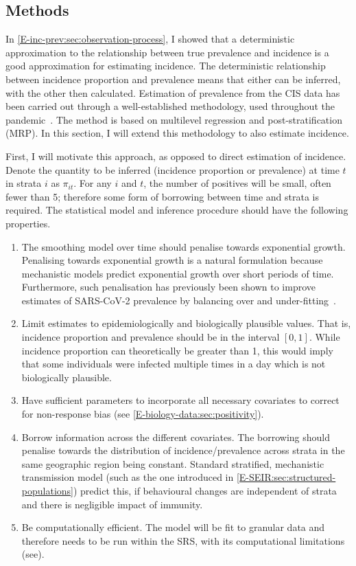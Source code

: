 \documentclass[thesis.tex]{subfiles}
\begin{document}
\subsection{Methods} \label{backcalc:sec:methods}

In \cref{E-inc-prev:sec:observation-process}, I showed that a deterministic approximation to the relationship between true prevalence and incidence is a good approximation for estimating incidence.
The deterministic relationship between incidence proportion and prevalence means that either can be inferred, with the other then calculated.
Estimation of prevalence from the CIS data has been carried out through a well-established methodology, used throughout the pandemic~\autocite{pouwelsCommunity,cisMethodsONS}.
The method is based on multilevel regression and post-stratification (MRP).
In this section, I will extend this methodology to also estimate incidence.

First, I will motivate this approach, as opposed to direct estimation of incidence.
Denote the quantity to be inferred (incidence proportion or prevalence) at time $t$ in strata $i$ as $\pi_{it}$.
For any $i$ and $t$, the number of positives will be small, often fewer than 5; therefore some form of borrowing between time and strata is required.
The statistical model and inference procedure should have the following properties.
\begin{enumerate}
    \item The smoothing model over time should penalise towards exponential growth. Penalising towards exponential growth is a natural formulation because mechanistic models predict exponential growth over short periods of time. Furthermore, such penalisation has previously been shown to improve estimates of SARS-CoV-2 prevalence by balancing over and under-fitting~\autocite{ealesAppropriately}.
    \item Limit estimates to epidemiologically and biologically plausible values.
        That is, incidence proportion and prevalence should be in the interval $[0, 1]$.
        While incidence proportion can theoretically be greater than 1, this would imply that some individuals were infected multiple times in a day which is not biologically plausible.
    \item Have sufficient parameters to incorporate all necessary covariates to correct for non-response bias (see \cref{E-biology-data:sec:positivity}).
    \item Borrow information across the different covariates.
        The borrowing should penalise towards the distribution of incidence/prevalence across strata in the same geographic region being constant.
        Standard stratified, mechanistic transmission model (such as the one introduced in \cref{E-SEIR:sec:structured-populations}) predict this, if behavioural changes are independent of strata and there is negligible impact of immunity.
    \item Be computationally efficient.
        The model will be fit to granular data and therefore needs to be run within the SRS, with its computational limitations (see).
\end{enumerate}
\end{document}
